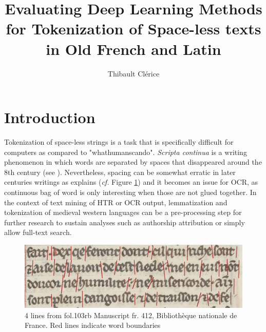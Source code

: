 \documentclass{jdmdh}
\title{Evaluating Deep Learning Methods for Tokenization of Space-less texts in Old French and Latin}
\author[1]{Thibault Clérice}
\affil[1]{École nationale des Chartes, France}
\affil[2]{Université Lyon 3, France}
\begin{document}
\maketitle



\section{Introduction}

Tokenization of space-less strings is a task that is specifically difficult for computers as compared to "whathumanscando". \textit{Scripta continua} is a writing phenomenon in which words are separated by spaces that disappeared around the 8th century (see \citet{zanna1998lecture}). Nevertheless, spacing can be somewhat erratic in later centuries writings as \citet{stutzmann} explains (\textit{cf.} Figure \ref{fig:4lines}) and it becomes an issue for OCR, as continuous bag of word is only interesting when those are not glued together. In the context of text mining of HTR or OCR output, lemmatization and tokenization of medieval western languages can be a pre-processing step for further research to sustain analyses such as authorship attribution or simply allow full-text search.

\begin{figure}[!ht]
  \centering
  \includegraphics[width=\linewidth]{4-lines-p0215.png}

  \caption{ 4 lines from fol.103rb Manuscript fr. 412, Bibliothèque nationale de France.  Red lines indicate word boundaries}
  \label{fig:4lines}
\end{figure}
\end{document}
